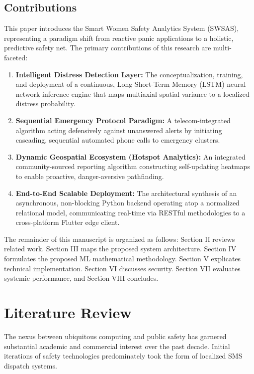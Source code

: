 \documentclass[10pt,journal,compsoc]{IEEEtran}
\begin{document}
\subsection{Contributions}
This paper introduces the Smart Women Safety Analytics System (SWSAS), representing a paradigm shift from reactive panic applications to a holistic, predictive safety net. The primary contributions of this research are multi-faceted:
\begin{enumerate}
    \item \textbf{Intelligent Distress Detection Layer:} The conceptualization, training, and deployment of a continuous, Long Short-Term Memory (LSTM) neural network inference engine that maps multiaxial spatial variance to a localized distress probability.
    \item \textbf{Sequential Emergency Protocol Paradigm:} A telecom-integrated algorithm acting defensively against unanswered alerts by initiating cascading, sequential automated phone calls to emergency clusters.
    \item \textbf{Dynamic Geospatial Ecosystem (Hotspot Analytics):} An integrated community-sourced reporting algorithm constructing self-updating heatmaps to enable proactive, danger-aversive pathfinding.
    \item \textbf{End-to-End Scalable Deployment:} The architectural synthesis of an asynchronous, non-blocking Python backend operating atop a normalized relational model, communicating real-time via RESTful methodologies to a cross-platform Flutter edge client.
\end{enumerate}

The remainder of this manuscript is organized as follows: Section II reviews related work. Section III maps the proposed system architecture. Section IV formulates the proposed ML mathematical methodology. Section V explicates technical implementation. Section VI discusses security. Section VII evaluates systemic performance, and Section VIII concludes.

\section{Literature Review}
The nexus between ubiquitous computing and public safety has garnered substantial academic and commercial interest over the past decade. Initial iterations of safety technologies predominately took the form of localized SMS dispatch systems.
\end{document}
